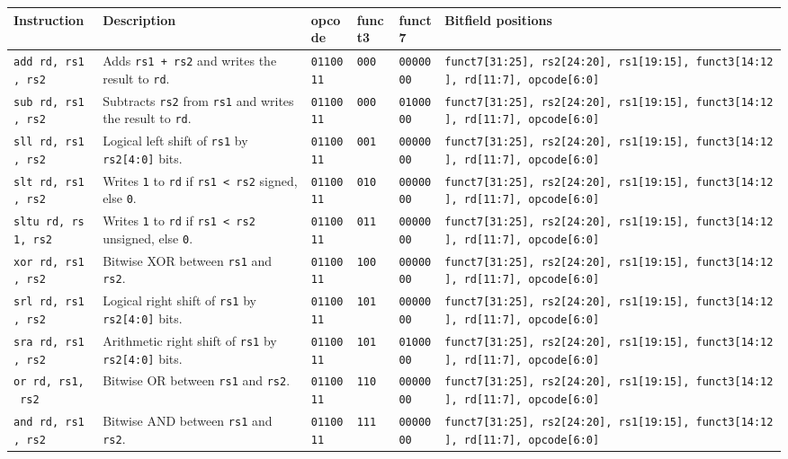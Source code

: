 \documentclass[]{article}
\begin{document}
\begin{longtable}[]{@{}llllll@{}}
\toprule
Instruction & Description & opcode & funct3 & funct7 & Bitfield
positions\tabularnewline
\midrule
\endhead
\texttt{add\ rd,\ rs1,\ rs2} & Adds \texttt{rs1\ +\ rs2} and writes the
result to \texttt{rd}. & \texttt{0110011} & \texttt{000} &
\texttt{0000000} &
\texttt{funct7{[}31:25{]},\ rs2{[}24:20{]},\ rs1{[}19:15{]},\ funct3{[}14:12{]},\ rd{[}11:7{]},\ opcode{[}6:0{]}}\tabularnewline
\texttt{sub\ rd,\ rs1,\ rs2} & Subtracts \texttt{rs2} from \texttt{rs1}
and writes the result to \texttt{rd}. & \texttt{0110011} & \texttt{000}
& \texttt{0100000} &
\texttt{funct7{[}31:25{]},\ rs2{[}24:20{]},\ rs1{[}19:15{]},\ funct3{[}14:12{]},\ rd{[}11:7{]},\ opcode{[}6:0{]}}\tabularnewline
\texttt{sll\ rd,\ rs1,\ rs2} & Logical left shift of \texttt{rs1} by
\texttt{rs2{[}4:0{]}} bits. & \texttt{0110011} & \texttt{001} &
\texttt{0000000} &
\texttt{funct7{[}31:25{]},\ rs2{[}24:20{]},\ rs1{[}19:15{]},\ funct3{[}14:12{]},\ rd{[}11:7{]},\ opcode{[}6:0{]}}\tabularnewline
\texttt{slt\ rd,\ rs1,\ rs2} & Writes \texttt{1} to \texttt{rd} if
\texttt{rs1\ \textless{}\ rs2} signed, else \texttt{0}. &
\texttt{0110011} & \texttt{010} & \texttt{0000000} &
\texttt{funct7{[}31:25{]},\ rs2{[}24:20{]},\ rs1{[}19:15{]},\ funct3{[}14:12{]},\ rd{[}11:7{]},\ opcode{[}6:0{]}}\tabularnewline
\texttt{sltu\ rd,\ rs1,\ rs2} & Writes \texttt{1} to \texttt{rd} if
\texttt{rs1\ \textless{}\ rs2} unsigned, else \texttt{0}. &
\texttt{0110011} & \texttt{011} & \texttt{0000000} &
\texttt{funct7{[}31:25{]},\ rs2{[}24:20{]},\ rs1{[}19:15{]},\ funct3{[}14:12{]},\ rd{[}11:7{]},\ opcode{[}6:0{]}}\tabularnewline
\texttt{xor\ rd,\ rs1,\ rs2} & Bitwise XOR between \texttt{rs1} and
\texttt{rs2}. & \texttt{0110011} & \texttt{100} & \texttt{0000000} &
\texttt{funct7{[}31:25{]},\ rs2{[}24:20{]},\ rs1{[}19:15{]},\ funct3{[}14:12{]},\ rd{[}11:7{]},\ opcode{[}6:0{]}}\tabularnewline
\texttt{srl\ rd,\ rs1,\ rs2} & Logical right shift of \texttt{rs1} by
\texttt{rs2{[}4:0{]}} bits. & \texttt{0110011} & \texttt{101} &
\texttt{0000000} &
\texttt{funct7{[}31:25{]},\ rs2{[}24:20{]},\ rs1{[}19:15{]},\ funct3{[}14:12{]},\ rd{[}11:7{]},\ opcode{[}6:0{]}}\tabularnewline
\texttt{sra\ rd,\ rs1,\ rs2} & Arithmetic right shift of \texttt{rs1} by
\texttt{rs2{[}4:0{]}} bits. & \texttt{0110011} & \texttt{101} &
\texttt{0100000} &
\texttt{funct7{[}31:25{]},\ rs2{[}24:20{]},\ rs1{[}19:15{]},\ funct3{[}14:12{]},\ rd{[}11:7{]},\ opcode{[}6:0{]}}\tabularnewline
\texttt{or\ rd,\ rs1,\ rs2} & Bitwise OR between \texttt{rs1} and
\texttt{rs2}. & \texttt{0110011} & \texttt{110} & \texttt{0000000} &
\texttt{funct7{[}31:25{]},\ rs2{[}24:20{]},\ rs1{[}19:15{]},\ funct3{[}14:12{]},\ rd{[}11:7{]},\ opcode{[}6:0{]}}\tabularnewline
\texttt{and\ rd,\ rs1,\ rs2} & Bitwise AND between \texttt{rs1} and
\texttt{rs2}. & \texttt{0110011} & \texttt{111} & \texttt{0000000} &
\texttt{funct7{[}31:25{]},\ rs2{[}24:20{]},\ rs1{[}19:15{]},\ funct3{[}14:12{]},\ rd{[}11:7{]},\ opcode{[}6:0{]}}\tabularnewline
\bottomrule
\end{longtable}
\end{document}
